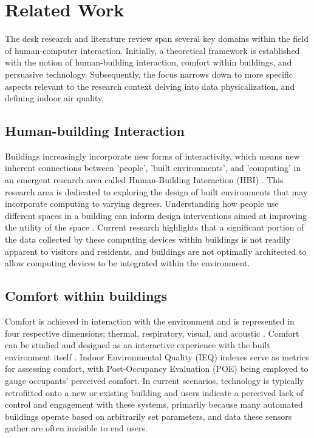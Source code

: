 \section{Related Work}

The desk research and literature review span several key domains within the field of human-computer interaction. Initially, a theoretical framework is established with the notion of human-building interaction, comfort within buildings, and persuasive technology. Subsequently, the focus narrows down to more specific aspects relevant to the research context delving into data physicalization, and defining indoor air quality.

\subsection{Human-building Interaction}
Buildings increasingly incorporate new forms of interactivity, which means new inherent connections between 'people', 'built environments', and 'computing' in an emergent research area called Human-Building Interaction (HBI) \cite{hbi}. This research area is dedicated to exploring the design of built environments that may incorporate computing to varying degrees. Understanding how people use different spaces in a building can inform design interventions aimed at improving the utility of the space \cite{informed}. Current research highlights that a significant portion of the data collected by these computing devices within buildings is not readily apparent to visitors and residents, and buildings are not optimally architected to allow computing devices to be integrated within the environment.

\subsection{Comfort within buildings}

Comfort is achieved in interaction with the environment and is represented in four respective dimensions; thermal, respiratory, visual, and acoustic \cite{comfort}. Comfort can be studied and designed as an interactive experience with the built environment itself \cite{environment}. Indoor Environmental Quality (IEQ) indexes serve as metrics for assessing comfort, with Post-Occupancy Evaluation (POE) being employed to gauge occupants' perceived comfort. In current scenarios, technology is typically retrofitted onto a new or existing building and users indicate a perceived lack of control and engagement with these systems, primarily because many automated buildings operate based on arbitrarily set parameters, and data these sensors gather are often invisible to end users.


